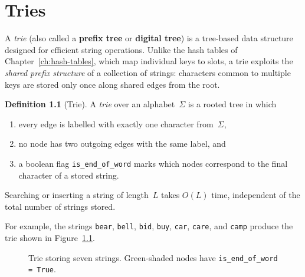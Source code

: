 \documentclass[11pt, a4paper, notitlepage]{report}
\theoremstyle{definition}
\newtheorem{definition}[theorem]{Definition}
\theoremstyle{remark}
\theoremstyle{definition}
\begin{document}
\chapter{Tries}
\label{ch:tries}

A \emph{trie} (also called a \textbf{prefix tree} or \textbf{digital tree})
is a tree-based data structure designed for efficient string operations.
Unlike the hash tables of Chapter~\ref{ch:hash-tables}, which map individual
keys to slots, a trie exploits the \emph{shared prefix structure} of a
collection of strings: characters common to multiple keys are stored only
once along shared edges from the root.

\begin{definition}[Trie]
\label{def:trie}
A \emph{trie} over an alphabet~$\Sigma$ is a rooted tree in which
\begin{enumerate}
  \item every edge is labelled with exactly one character from~$\Sigma$,
  \item no node has two outgoing edges with the same label, and
  \item a boolean flag \texttt{is\_end\_of\_word} marks which nodes correspond
        to the final character of a stored string.
\end{enumerate}
Searching or inserting a string of length~$L$ takes $O(L)$ time,
independent of the total number of strings stored.
\end{definition}

For example, the strings \texttt{bear}, \texttt{bell}, \texttt{bid},
\texttt{buy}, \texttt{car}, \texttt{care}, and \texttt{camp} produce the
trie shown in Figure~\ref{fig:trie-example}.

\begin{figure}[h]
\centering
{}
\caption{Trie storing seven strings. Green-shaded nodes have
         \texttt{is\_end\_of\_word = True}.}
\label{fig:trie-example}
\end{figure}
\end{document}
